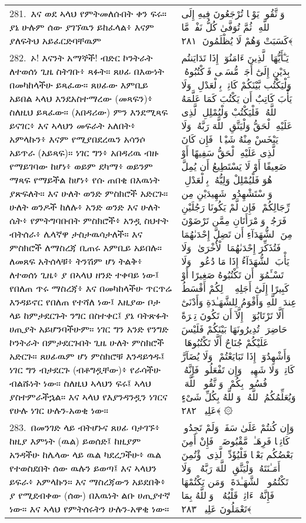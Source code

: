 \documentclass[11pt,a4paper,oneside]{article}%
\newcommand{\mytextarabic}[1]{\textarabic{ #1 \flushright}}
\begin{document}
\begin{longtable}{%
  @{}
    p{}
  @{~~~}
    p{}
    @{}
}
281.\ እና ወደ ኣላህ የምትመለሱበት ቀን ፍሩ። ያኔ ሁሉም ሰው ያገኘዉን ይከፈላል፥ እናም ያለፍትህ አይፈርድባቸዉም &  \mytextarabic{وَٱتَّقُوا۟ يَوْمًۭا تُرْجَعُونَ فِيهِ إِلَى ٱللَّهِ ۖ ثُمَّ تُوَفَّىٰ كُلُّ نَفْسٍۢ مَّا كَسَبَتْ وَهُمْ لَا يُظْلَمُونَ ﴿٢٨١﴾}\\
282.\ ኦ! እናንት አማኞች! ብድር ኮንትራት ለተወሰነ ጊዜ ስትገቡ፥ ጻፉት። ጸሀፊ በእውነት በመካከላችሁ ይጻፈው። ጸሀፊው እምቢይ አይበል ኣላህ እንደአስተማረው (መጻፍን)፥ ስለዚህ ይጻፈው። (አበዳሪው) ምን እንደሚጻፍ ይናገር፥ እና ኣላህን መፍራት አለበት፥ አምላኩን፥ እናም የሚያበደረዉን አሳንሶ አይጥራ (አይጻፍ)። ነገር ግን፥ አበዳሪዉ ብዙ የማይገባው ከሆነ፥ ወይም ደካማ፥ ወይንም ማጻፍ የማይችል ከሆነ፥ የሱ ጠበቂ በእዉነት ያጽፍለት። እና ሁለት ወንድ ምስክሮች አድርጉ። ሁለት ወንዶች ከለሉ፥ አንድ ወንድ እና ሁለት ሴት፥ የምትግባቡበት ምስክሮች፥ አንዷ ስህተት ብትሰራ፥ ሌላኛዋ ታስታዉሳታለች። እና ምስክሮች ለማስረጃ ቢጠሩ እምቢይ አይበሉ። ለመጸፍ አትሰላቹ፥ ትንሽም ሆነ ትልቅ፥ ለተወሰነ ጊዜ፥ ያ በኣላህ ዘንድ ተቀባይ ነው፤ የበለጠ ጥሩ ማስረጃ፥ እና በመካከላችሁ ጥርጥሬ እንዳይኖር የበለጠ የተሻለ ነው፤ እዚያው ቦታ ላይ ከምታደርጉት ንግር በስተቀር፤ ያኔ ባትጽፉት ሀጢያት አይሆንባችሁም። ነገር ግን አንድ የንግድ ኮንትራት በምታደርጉበት ጊዜ ሁለት ምስክሮች አድርጉ። ጸሀፊዉም ሆነ ምስክሮቹ እንዳይጎዱ፤ ነገር ግን ብታደርጉ (ብቶግዷቸው)፥ የራሳችሁ ብልሹነት ነው። ስለዚህ ኣላህን ፍሩ፤ ኣላህ ያስተምራችኋል። እና ኣላህ የእያንዳንዷን ነገርና የሁሉ ነገር ሁሉን-አወቂ ነው።  &  \mytextarabic{ يَـٰٓأَيُّهَا ٱلَّذِينَ ءَامَنُوٓا۟ إِذَا تَدَايَنتُم بِدَيْنٍ إِلَىٰٓ أَجَلٍۢ مُّسَمًّۭى فَٱكْتُبُوهُ ۚ وَلْيَكْتُب بَّيْنَكُمْ كَاتِبٌۢ بِٱلْعَدْلِ ۚ وَلَا يَأْبَ كَاتِبٌ أَن يَكْتُبَ كَمَا عَلَّمَهُ ٱللَّهُ ۚ فَلْيَكْتُبْ وَلْيُمْلِلِ ٱلَّذِى عَلَيْهِ ٱلْحَقُّ وَلْيَتَّقِ ٱللَّهَ رَبَّهُۥ وَلَا يَبْخَسْ مِنْهُ شَيْـًۭٔا ۚ فَإِن كَانَ ٱلَّذِى عَلَيْهِ ٱلْحَقُّ سَفِيهًا أَوْ ضَعِيفًا أَوْ لَا يَسْتَطِيعُ أَن يُمِلَّ هُوَ فَلْيُمْلِلْ وَلِيُّهُۥ بِٱلْعَدْلِ ۚ وَٱسْتَشْهِدُوا۟ شَهِيدَيْنِ مِن رِّجَالِكُمْ ۖ فَإِن لَّمْ يَكُونَا رَجُلَيْنِ فَرَجُلٌۭ وَٱمْرَأَتَانِ مِمَّن تَرْضَوْنَ مِنَ ٱلشُّهَدَآءِ أَن تَضِلَّ إِحْدَىٰهُمَا فَتُذَكِّرَ إِحْدَىٰهُمَا ٱلْأُخْرَىٰ ۚ وَلَا يَأْبَ ٱلشُّهَدَآءُ إِذَا مَا دُعُوا۟ ۚ وَلَا تَسْـَٔمُوٓا۟ أَن تَكْتُبُوهُ صَغِيرًا أَوْ كَبِيرًا إِلَىٰٓ أَجَلِهِۦ ۚ ذَٟلِكُمْ أَقْسَطُ عِندَ ٱللَّهِ وَأَقْوَمُ لِلشَّهَـٰدَةِ وَأَدْنَىٰٓ أَلَّا تَرْتَابُوٓا۟ ۖ إِلَّآ أَن تَكُونَ تِجَٟرَةً حَاضِرَةًۭ تُدِيرُونَهَا بَيْنَكُمْ فَلَيْسَ عَلَيْكُمْ جُنَاحٌ أَلَّا تَكْتُبُوهَا ۗ وَأَشْهِدُوٓا۟ إِذَا تَبَايَعْتُمْ ۚ وَلَا يُضَآرَّ كَاتِبٌۭ وَلَا شَهِيدٌۭ ۚ وَإِن تَفْعَلُوا۟ فَإِنَّهُۥ فُسُوقٌۢ بِكُمْ ۗ وَٱتَّقُوا۟ ٱللَّهَ ۖ وَيُعَلِّمُكُمُ ٱللَّهُ ۗ وَٱللَّهُ بِكُلِّ شَىْءٍ عَلِيمٌۭ ﴿٢٨٢﴾ ۞}\\
283.\ በመንገድ ላይ ብትሆኑና ጸሀፊ ባታገኙ፥ ከዚያ እምነት (ዉል) ይወሰድ፤ ከዚያም አንዳችሁ ከሌላው ላይ ዉል ካደረጋችሁ፥ ዉል የተወስደበት ሰው ዉሉን ይወጣ፤ እና ኣላህን ይፍራ፥ አምላኩን። እና ማስረጃውን አይደበቅ፥ ያ የሚደብቀው (ሰው) በእዉነት ልቡ ሀጢያተኛ ነው። እና ኣላህ የምትሰሩትን ሁሉን-አዋቂ ነው። &  \mytextarabic{ وَإِن كُنتُمْ عَلَىٰ سَفَرٍۢ وَلَمْ تَجِدُوا۟ كَاتِبًۭا فَرِهَـٰنٌۭ مَّقْبُوضَةٌۭ ۖ فَإِنْ أَمِنَ بَعْضُكُم بَعْضًۭا فَلْيُؤَدِّ ٱلَّذِى ٱؤْتُمِنَ أَمَـٰنَتَهُۥ وَلْيَتَّقِ ٱللَّهَ رَبَّهُۥ ۗ وَلَا تَكْتُمُوا۟ ٱلشَّهَـٰدَةَ ۚ وَمَن يَكْتُمْهَا فَإِنَّهُۥٓ ءَاثِمٌۭ قَلْبُهُۥ ۗ وَٱللَّهُ بِمَا تَعْمَلُونَ عَلِيمٌۭ ﴿٢٨٣﴾}\\

\end{longtable}
\end{document}
